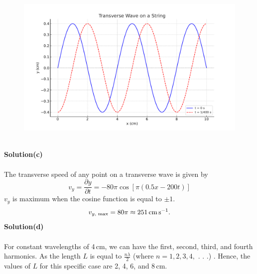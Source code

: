 \documentclass{article}
\begin{document}
\begin{figure}[h]
    \centering
    \includegraphics[width=1\linewidth]{figs/fig_sol_8.2b.pdf}
\end{figure}
\\\textbf{Solution(c)}
\\
\\The transverse speed of any point on a transverse wave is given by
\[v_y=\frac{\partial y}{\partial t}=-80\pi\cos[\pi(0.5x-200t)]\]
$v_y$ is maximum when the cosine function is equal to $\pm1$. 
\[v_{y,\text{ max}}=80\pi\approx251\,\text{cm\,s}^{-1}.\]
\textbf{Solution(d)}
\\
\\For constant wavelengths of 4\,cm, we can have the first, second, third, and fourth harmonics. As the length $L$ is equal to $\frac{n\lambda}{2}$ (where $n=1,2,3,4,$ . . .) . Hence, the values of $L$ for this specific case are 2, 4, 6, and 8\,cm.
\end{document}
